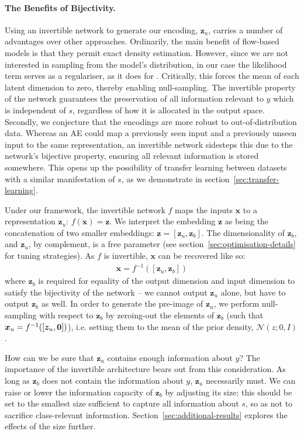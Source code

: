 \paragraph{The Benefits of Bijectivity.}
Using an invertible network to generate our encoding, $\bm{z}_u$, carries a number of advantages over other approaches.
Ordinarily, the main benefit of flow-based models is that they permit exact density estimation. 
However, since we are not interested in sampling from the model's distribution, in our case the likelihood term serves as a regulariser, as it does for  \citet{JacSmeOya18}. 
Critically, this forces the mean of each latent dimension to zero, thereby enabling null-sampling. 
The invertible property of the network guarantees the preservation of all information relevant to $y$ which is independent of $s$, regardless of how it is allocated in the output space.
Secondly, we conjecture that the encodings are more robust to out-of-distribution data.
Whereas an \acf{AE} could map a previously seen input and a previously unseen input to the same representation,
an invertible network sidesteps this due to the network's bijective property, ensuring all relevant information is stored somewhere. This opens up the possibility of transfer learning between datasets with a similar manifestation of $s$, as we demonstrate in section~\ref{sec:transfer-learning}.

Under our framework, the invertible network $f$ maps the inputs $\bm{x}$ to a representation $\bm{z}_u$:
$f(\bm{x}) = \bm{z}$.
We interpret the embedding $\bm{z}$ as being the concatenation of two smaller embeddings: $\bm{z} = [\bm{z}_u, \bm{z}_b]$.
The dimensionality of $\bm{z}_b$, and $\bm{z}_u$, by complement, is a free parameter (see section~\ref{sec:optimisation-details} for tuning strategies).
As $f$ is invertible, $\bm{x}$ can be recovered like so:
\begin{align}
  \bm{x} = f^{-1}([\bm{z}_u, \bm{z}_b])
  \label{eq:zreconstruct}
\end{align}
where $\bm{z}_b$ is required for equality of the output dimension and input dimension to satisfy the bijectivity of the network -- we cannot output $\bm{z}_u$ alone, but have to output $\bm{z}_b$ as well. In order to generate the pre-image of $\bm{z}_u$, we perform null-sampling with respect to $\bm{z}_b$ by zeroing-out the elements of $\bm{z}_b$ (such that $\bm{x}_{u} = f^{-1}([\bm{z}_{u}, {\bm{0}}])$), i.e. setting them to the mean of the prior density, $\mathcal{N}(z;0, I)$.

How can we be sure that $\bm{z}_u$ contains enough information about $y$?
The importance of the invertible architecture bears out from this consideration. %
As long as $\bm{z}_b$ does not contain the information about $y$, $\bm{z}_u$ necessarily must.
We can raise or lower the information capacity of $\bm{z}_b$ by adjusting its size;
this should be set to the smallest size sufficient to capture all information about $s$, so as not to sacrifice class-relevant information.
Section~\ref{sec:additional-results} explores the effects of the size further.

